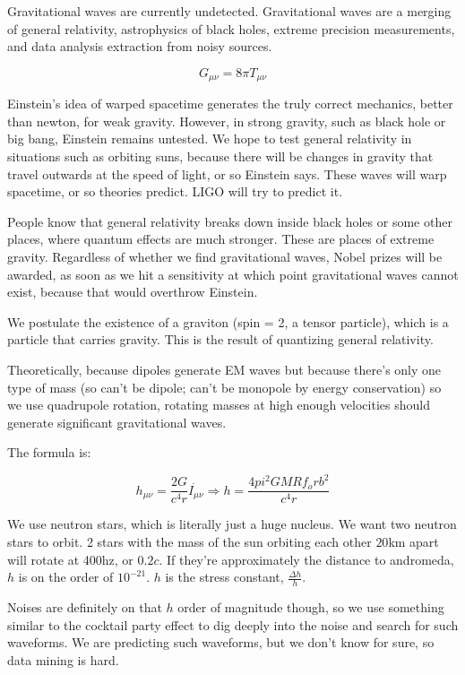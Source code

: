 \documentclass{report}
\begin{document}
Gravitational waves are currently undetected. Gravitational waves are a merging of general relativity, astrophysics of black holes, extreme precision measurements, and data analysis extraction from noisy sources.

$$G_{\mu \nu} = 8 \pi T_{\mu \nu}$$

Einstein's idea of warped spacetime generates the truly correct mechanics, better than newton, for weak gravity. However, in strong gravity, such as black hole or big bang, Einstein remains untested. We hope to test general relativity in situations such as orbiting suns, because there will be changes in gravity that travel outwards at the speed of light, or so Einstein says. These waves will warp spacetime, or so theories predict. LIGO will try to predict it. 

People know that general relativity breaks down inside black holes or some other places, where quantum effects are much stronger. These are places of extreme gravity. Regardless of whether we find gravitational waves, Nobel prizes will be awarded, as soon as we hit a sensitivity at which point gravitational waves cannot exist, because that would overthrow Einstein.

We postulate the existence of a graviton (spin = 2, a tensor particle), which is a particle that carries gravity. This is the result of quantizing general relativity.

Theoretically, because dipoles generate EM waves but because there's only one type of mass (so can't be dipole; can't be monopole by energy conservation) so we use quadrupole rotation, rotating masses at high enough velocities should generate significant gravitational waves.

The formula is:

$$h_{\mu \nu} = \frac{2G}{c^4r} \ddot{I_{\mu \nu}} \Rightarrow h = \frac{4pi^2GMR f_orb^2}{c^4r}$$

We use neutron stars, which is literally just a huge nucleus. We want two neutron stars to orbit. 2 stars with the mass of the sun orbiting each other $20$km apart will rotate at 400hz, or $0.2c$. If they're approximately the distance to andromeda, $h$ is on the order of $10^{-21}$. $h$ is the stress constant, $\frac{\Delta h}{h}$. 

Noises are definitely on that $h$ order of magnitude though, so we use something similar to the cocktail party effect to dig deeply into the noise and search for such waveforms. We are predicting such waveforms, but we don't know for sure, so data mining is hard.
\end{document}
